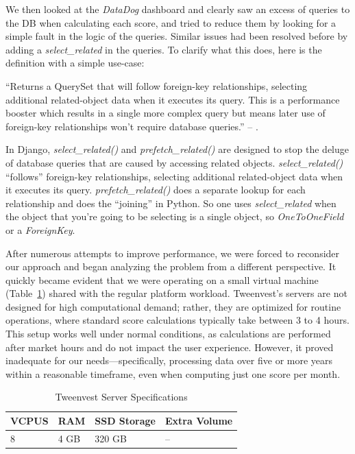 \documentclass[11pt,english,a4paper,hidelinks]{book}
\begin{document}
\noindent We then looked at the \textit{DataDog} dashboard and clearly saw an excess of queries to the DB when calculating each score, and tried to reduce them by looking for a simple fault in the logic of the queries. Similar issues had been resolved before by adding a \textit{select\_related} in the queries. To clarify what this does, here is the definition with a simple use-case:

\vspace{0.5cm}
\noindent ``Returns a QuerySet that will follow foreign-key relationships, selecting additional related-object data when it executes its query. This is a performance booster which results in a single more complex query but means later use of foreign-key relationships won't require database queries.'' -- \textcite{django2025selectrelated}.

\vspace{0.5cm}
\noindent In Django, \textit{select\_related()} and \textit{prefetch\_related()} are designed to stop the deluge of database queries that are caused by accessing related objects. \textit{select\_related()} ``follows'' foreign-key relationships, selecting additional related-object data when it executes its query. \textit{prefetch\_related()} does a separate lookup for each relationship and does the ``joining'' in Python. So one uses \textit{select\_related} when the object that you're going to be selecting is a single object, so \textit{OneToOneField} or a \textit{ForeignKey}.

\vspace{0.5cm}
\noindent After numerous attempts to improve performance, we were forced to reconsider our approach and began analyzing the problem from a different perspective. It quickly became evident that we were operating on a small virtual machine (Table~\ref{tab:tweenvest_server_specs}) shared with the regular platform workload. Tweenvest's servers are not designed for high computational demand; rather, they are optimized for routine operations, where standard score calculations typically take between 3 to 4 hours. This setup works well under normal conditions, as calculations are performed after market hours and do not impact the user experience. However, it proved inadequate for our needs—specifically, processing data over five or more years within a reasonable timeframe, even when computing just one score per month.

\begin{table}[H]
    \centering
    \begin{tabular}{|l|l|l|l|}
        \hline
        \textbf{VCPUS} & \textbf{RAM} & \textbf{SSD Storage} & \textbf{Extra Volume} \\
        \hline
        8 & 4 GB & 320 GB & -- \\
        \hline
    \end{tabular}
    \caption{Tweenvest Server Specifications}
    \label{tab:tweenvest_server_specs}
\end{table}
\end{document}

